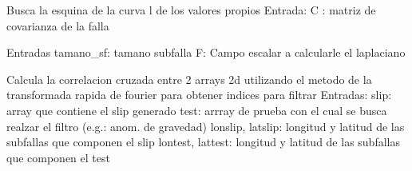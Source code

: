 \documentclass[letterpaper,10pt,english]{sphinxmanual}
\begin{document}
\begin{fulllineitems}
\label{\detokenize{main:main.N_max_matriz_covarianza}}
\pysigstartsignatures
{}
\pysigstopsignatures
\sphinxAtStartPar
Busca la esquina de la curva l de los valores propios
Entrada:
C : matriz de covarianza de la falla

\end{fulllineitems}


\begin{fulllineitems}
\label{\detokenize{main:main.calcula_laplaciano}}
\pysigstartsignatures
{}
\pysigstopsignatures
\sphinxAtStartPar
Entradas 
tamano\_sf: tamano subfalla
F: Campo escalar a calcularle el laplaciano

\end{fulllineitems}


\begin{fulllineitems}
\label{\detokenize{main:main.corr2d_fourier}}
\pysigstartsignatures
{}
\pysigstopsignatures
\sphinxAtStartPar
Calcula la correlacion cruzada entre 2 arrays 2d utilizando el metodo de la 
transformada rapida de fourier para obtener indices para filtrar
Entradas:
slip: array que contiene el slip generado
test: arrray de prueba con el cual se busca realzar el filtro (e.g.: anom. de gravedad)
lonslip, latslip: longitud y latitud de las subfallas que componen el slip
lontest, lattest: longitud y latitud de las subfallas que componen el test

\end{fulllineitems}
\end{document}
